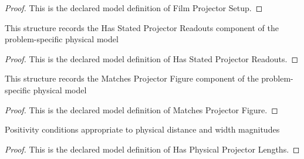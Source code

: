 \begin{proof}
  This is the declared model definition of Film Projector Setup.
\end{proof}
\begin{definition}
  \label{def:physics:phyx-mini-0136:phyxminiproblems-problemphyxmini0136-hasstatedprojectorreadouts}
  This structure records the Has Stated Projector Readouts component of the problem-specific physical model
\end{definition}
\begin{proof}
  This is the declared model definition of Has Stated Projector Readouts.
\end{proof}
\begin{definition}
  \label{def:physics:phyx-mini-0136:phyxminiproblems-problemphyxmini0136-matchesprojectorfigure}
  This structure records the Matches Projector Figure component of the problem-specific physical model
\end{definition}
\begin{proof}
  This is the declared model definition of Matches Projector Figure.
\end{proof}
\begin{definition}
  \label{def:physics:phyx-mini-0136:phyxminiproblems-problemphyxmini0136-hasphysicalprojectorlengths}
  Positivity conditions appropriate to physical distance and width magnitudes
\end{definition}
\begin{proof}
  This is the declared model definition of Has Physical Projector Lengths.
\end{proof}
